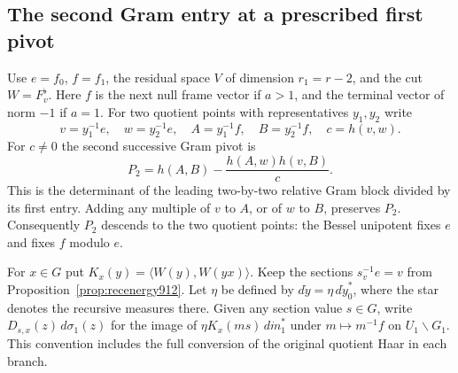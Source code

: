 \documentclass[a4paper,11pt]{article}
\theoremstyle{definition}
\theoremstyle{remark}
\numberwithin{equation}{section}
\begin{document}
\subsection{The second Gram entry at a prescribed first pivot}
\label{sec:conditionedpivot917}

Use \(e=f_0\), \(f=f_1\), the residual space \(V\) of
dimension \(r_1=r-2\), and the cut \(W=F_v^\flat\).
Here \(f\) is the next null frame vector if \(a>1\), and
the terminal vector of norm \(-1\) if \(a=1\). For two
quotient points with representatives \(y_1,y_2\) write
\[
 v=y_1^{-1}e,\quad w=y_2^{-1}e,\quad
 A=y_1^{-1}f,\quad B=y_2^{-1}f,\quad c=h(v,w).
\]
For \(c\ne0\) the second successive Gram pivot is
\[
       P_2=h(A,B)-\frac{h(A,w)h(v,B)}{c}.
\]
This is the determinant of the leading two-by-two relative
Gram block divided by its first entry. Adding any multiple of
\(v\) to \(A\), or of \(w\) to \(B\), preserves \(P_2\).
Consequently \(P_2\) descends to the two quotient points:
the Bessel unipotent fixes \(e\) and fixes \(f\) modulo \(e\).

For \(x\in G\) put \(K_x(y)=\langle W(y),W(yx)\rangle\).
Keep the sections \(s_v^{-1}e=v\) from
Proposition~\ref{prop:recenergy912}. Let \(\eta\) be defined
by \(d\dot y=\eta\,d\dot y_0^*\), where the star denotes the
recursive measures there. Given any section value \(s\in G\),
write \(D_{s,x}(z)\,d\sigma_1(z)\) for the image of
\(\eta K_x(ms)\,d\dot m_1^*\) under \(m\mapsto m^{-1}f\)
on \(U_1\backslash G_1\). This convention includes the full
conversion of the original quotient Haar in each branch.
\end{document}
